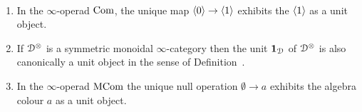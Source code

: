 \begin{examples}\
\begin{enumerate}
\item
In the $\infty$-operad $\mathrm{Com}$, the unique map $\langle0\rangle \to \langle1\rangle$ exhibits the $\langle1\rangle$ as a unit object. 
\item
If $\mathcal{D}^{\otimes}$ is a symmetric monoidal $\infty$-category then the unit $\mathbf{1}_{\mathcal{D}}$ of $\mathcal{D}^{\otimes}$ is also canonically a unit object in the sense of Definition~.
\item
In the $\infty$-operad $\mathrm{MCom}$ the unique null operation $\emptyset \to a$ exhibits the algebra colour $a$ as a unit object. 
\end{enumerate}
\end{examples}



